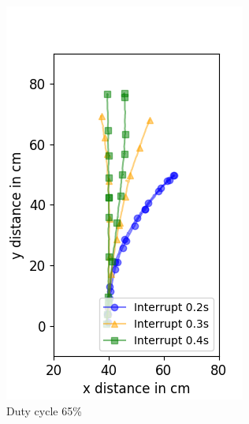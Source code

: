 \begin{figure}
\begin{subfigure}[b]{0.32\textwidth}
		\includegraphics[width=\textwidth]{pics/figure_65.png}
		\caption{Duty cycle 65\%}
		\label{fig:target_65}
	\end{subfigure}
	\begin{subfigure}[b]{0.32\textwidth}

\end{subfigure}
\end{figure}
